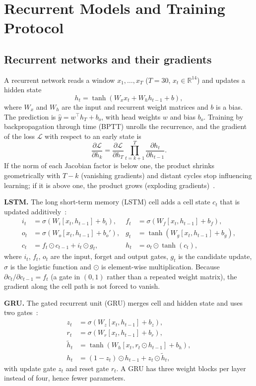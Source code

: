 \section{Recurrent Models and Training Protocol}
\label{sec:recurrent}

\subsection{Recurrent networks and their gradients}
A recurrent network reads a window $x_1,\dots,x_T$ ($T=30$, $x_t\in\mathbb{R}^{14}$) and updates a hidden state
\begin{equation}
h_t=\tanh\!\left(W_x x_t+W_h h_{t-1}+b\right),
\end{equation}
where $W_x$ and $W_h$ are the input and recurrent weight matrices and $b$ is a bias.  The prediction is $\hat y=w^\top h_T+b_o$, with head weights $w$ and bias $b_o$.  Training by backpropagation through time (BPTT) unrolls the recurrence, and the gradient of the loss $\mathcal{L}$ with respect to an early state is
\begin{equation}
\frac{\partial \mathcal{L}}{\partial h_k}=\frac{\partial \mathcal{L}}{\partial h_T}\prod_{t=k+1}^{T}\frac{\partial h_t}{\partial h_{t-1}} .
\end{equation}
If the norm of each Jacobian factor is below one, the product shrinks geometrically with $T-k$ (vanishing gradients) and distant cycles stop influencing learning; if it is above one, the product grows (exploding gradients)~\cite{pascanu_2013_difficulty}.

\textbf{LSTM.}  The long short-term memory (LSTM) cell adds a cell state $c_t$ that is updated additively~\cite{hochreiter_1997_lstm,gers_2000_forget}:
\begin{align}
i_t&=\sigma(W_i[x_t,h_{t-1}]+b_i), & f_t&=\sigma(W_f[x_t,h_{t-1}]+b_f),\\
o_t&=\sigma(W_o[x_t,h_{t-1}]+b_o'), & g_t&=\tanh(W_g[x_t,h_{t-1}]+b_g),\\
c_t&=f_t\odot c_{t-1}+i_t\odot g_t, & h_t&=o_t\odot\tanh(c_t),
\end{align}
where $i_t$, $f_t$, $o_t$ are the input, forget and output gates, $g_t$ is the candidate update, $\sigma$ is the logistic function and $\odot$ is element-wise multiplication.  Because $\partial c_t/\partial c_{t-1}=f_t$ (a gate in $(0,1)$ rather than a repeated weight matrix), the gradient along the cell path is not forced to vanish.

\textbf{GRU.}  The gated recurrent unit (GRU) merges cell and hidden state and uses two gates~\cite{cho_2014_gru}:
\begin{align}
z_t&=\sigma(W_z[x_t,h_{t-1}]+b_z),\\
r_t&=\sigma(W_r[x_t,h_{t-1}]+b_r),\\
\tilde h_t&=\tanh(W_h[x_t,r_t\odot h_{t-1}]+b_h),\\
h_t&=(1-z_t)\odot h_{t-1}+z_t\odot\tilde h_t,
\end{align}
with update gate $z_t$ and reset gate $r_t$.  A GRU has three weight blocks per layer instead of four, hence fewer parameters.

